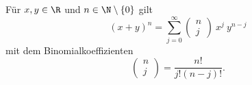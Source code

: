 \documentclass[letterpaper,10pt,english]{jupyterBook}
\begin{document}
\begin{lemma}{}{}



Für \(x,y \in \R\) und \(n \in \N\setminus\{0\}\) gilt
\begin{equation*}
 (x+y)^n = \sum_{j=0}^\infty (\begin{matrix} n\\j \end{matrix} ) ~  x^j~ y^{n-j}
\end{equation*}
mit dem Binomialkoeffizienten
\begin{equation*}
  (\begin{matrix} n\\j \end{matrix} ) = \frac{n!}{j! (n-j)!}.
\end{equation*}\end{lemma}
\end{document}
